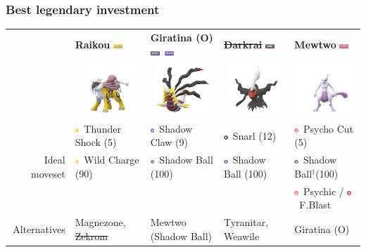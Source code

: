 \documentclass[8pt,aspectratio=169,compress]{beamer}
\newcommand{\darkfull}{\includegraphics[height=0.15cm]{../../images/type/full/Dark.png}}
\newcommand{\electricfull}{\includegraphics[height=0.15cm]{../../images/type/full/Electric.png}}
\newcommand{\ghostfull}{\includegraphics[height=0.15cm]{../../images/type/full/Ghost.png}}
\newcommand{\dragonfull}{\includegraphics[height=0.15cm]{../../images/type/full/Dragon.png}}
\newcommand{\psychicfull}{\includegraphics[height=0.15cm]{../../images/type/full/Psychic.png}}
\newcommand{\fightingsimp}{\includegraphics[height=0.15cm]{../../images/type/simplified/fighting.png}}
\newcommand{\darksimp}{\includegraphics[height=0.15cm]{../../images/type/simplified/dark.png}}
\newcommand{\ghostsimp}{\includegraphics[height=0.15cm]{../../images/type/simplified/ghost.png}}
\newcommand{\psysimp}{\includegraphics[height=0.15cm]{../../images/type/simplified/psy.png}}
\newcommand{\electricsimp}{\includegraphics[height=0.15cm]{../../images/type/simplified/electric.png}}
\begin{document}
\begin{frame}
\begin{tiny}
\frametitle{Best legendary investment}

\begin{block}{}
\begin{center}
\begin{tabular}{rp{2.5cm}p{2.5cm}p{2.5cm}p{2.5cm}} 
    &  \textbf{Raikou} \hfill \electricfull&  \textbf{Giratina (O)} \hfill \ghostfull~\dragonfull & \sout{\textbf{Darkrai}} \hfill \darkfull & \textbf{Mewtwo} \hfill \psychicfull  \\ 
    &    \multicolumn{1}{c}{\includegraphics[width=2cm]{../../images/pokemon/Raikou} }  &      \multicolumn{1}{c}{\includegraphics[width=2cm]{../../images/pokemon/Giratina_o} }   &   \multicolumn{1}{c}{\includegraphics[width=2cm]{../../images/pokemon/Darkrai} }  &   \multicolumn{1}{c}{\includegraphics[width=2cm]{../../images/pokemon/Mewtwo} }  \\ \hline
\multirow{3}{*}{Ideal moveset}   &  \electricsimp~Thunder Shock (5)  &\ghostsimp~Shadow Claw (9)&\darksimp~Snarl (12) & \psysimp~Psycho Cut (5) \\
    & \electricsimp~Wild Charge (90) & \ghostsimp~Shadow Ball (100)  & \ghostsimp~Shadow Ball (100)  & \ghostsimp~Shadow Ball$^{\dag}$(100) \\  
    & & & & \psysimp~Psychic / \fightingsimp~F.Blast \\ \hline
Alternatives & Magnezone, \sout{Zekrom} & Mewtwo (Shadow Ball) & Tyranitar, Weawile & Giratina (O) \\
\end{tabular}   


\end{center}
\end{block}
\end{tiny}
\end{frame}
\end{document}
